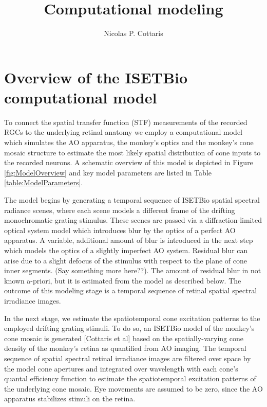\documentclass[11pt, oneside]{article}   	%
\title{Computational modeling}
\author{Nicolas P. Cottaris}
\date{}							%
\begin{document}
\maketitle
\section{Overview of the ISETBio computational model}
To connect the spatial transfer function (STF) measurements of the recorded RGCs to the underlying retinal anatomy we employ a computational model which simulates the AO apparatus, the monkey's optics and the monkey's cone mosaic structure to estimate the most likely spatial distribution of cone inputs to the recorded neurons. A schematic overview of this model is depicted in Figure \ref{fig:ModelOverview} and key model parameters are listed in Table \ref{table:ModelParameters}.

The model begins by generating a temporal sequence of ISETBio spatial spectral radiance scenes, where each scene models a different frame of the drifting monochromatic grating stimulus. These scenes are passed via a diffraction-limited optical system model which introduces blur by the optics of a perfect AO apparatus. A variable, additional amount of blur is introduced in the next step which models the optics of a slightly imperfect AO system. Residual blur can arise due to a slight defocus of the stimulus with respect to the plane of cone inner segments. (Say something more here??). The amount of residual blur in not known a-priori, but it is estimated from the model as described below. The outcome of this modeling stage is a temporal sequence of retinal spatial spectral irradiance images.

In the next stage, we estimate the spatiotemporal cone excitation patterns to the employed drifting grating stimuli. To do so, an ISETBio model of the monkey's cone mosaic is generated [Cottaris et al] based on the spatially-varying cone density of the monkey's retina as quantified from AO imaging. The temporal sequence of spatial spectral retinal irradiance images are filtered over space by the model cone apertures and integrated over wavelength with each cone's quantal efficiency function to estimate the spatiotemporal excitation patterns of the underlying cone mosaic. Eye movements are assumed to be zero, since the AO apparatus stabilizes stimuli on the retina.
\end{document}
